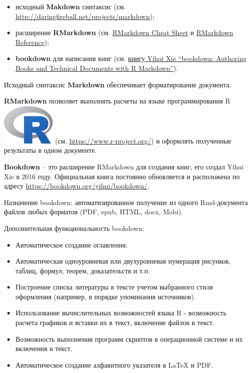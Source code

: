 \documentclass[
  a4paper,
]{book}
\providecommand{\tightlist}{%
  \setlength{\itemsep}{0pt}\setlength{\parskip}{0pt}}
\theoremstyle{definition}
\theoremstyle{definition}
\theoremstyle{definition}
\theoremstyle{definition}
\theoremstyle{remark}
\begin{document}
\begin{itemize}
\tightlist
\item
  исходный \textbf{Makdown} синтаксис (см. \url{http://daringfireball.net/projects/markdown});
\item
  расширение \textbf{RMarkdown} (см. \href{https://raw.githubusercontent.com/rstudio/cheatsheets/master/rmarkdown-2.0.pdf}{RMarkdown Cheat Sheet} и \href{https://www.rstudio.com/wp-content/uploads/2015/03/rmarkdown-reference.pdf}{RMarkdown Reference});
\item
  \textbf{bookdown} для написания книг (см. \href{https://bookdown.org/yihui/bookdown/}{книгу Yihui Xie ``bookdown: Authoring Books and Technical Documents with R Markdown''}).
\end{itemize}

Исходный синтаксис \textbf{Markdown} обеспечивает форматирование документа.

\textbf{RMarkdown} позволяет выполнять расчеты на языке программирования R \includegraphics{figures/Rlogo.png} (см. \url{https://www.r-project.org/}) и оформлять полученные результаты в одном документе.

\textbf{Bookdown} -- это расширение RMarkdown для создания книг, его создал Yihui Xie в 2016 году. Официальная книга постоянно обновляется и расположена по адресу \url{https://bookdown.org/yihui/bookdown/}.

Назначение bookdown: автоматизированное получение из одного Rmd-документа файлов любых форматов (PDF, epub, HTML, docx, Mobi).

Дополнительная функциональность bookdown:

\begin{itemize}
\tightlist
\item
  Автоматическое создание оглавления.
\item
  Автоматическая одноуровневая или двухуровневая нумерация рисунков, таблиц, формул, теорем, доказательств и т.п.
\item
  Построение списка литературы в тексте учетом выбранного стиля оформления (например, в порядке упоминания источников).
\item
  Использование вычислительных возможностей языка R - возможность расчета графиков и вставки их в текст, включение файлов в текст.
\item
  Возможность выполнения программ скриптов в операционной системе и их включения в текст.
\item
  Автоматическое создание алфавитного указателя в LaTeX и PDF.
\end{itemize}
\end{document}
